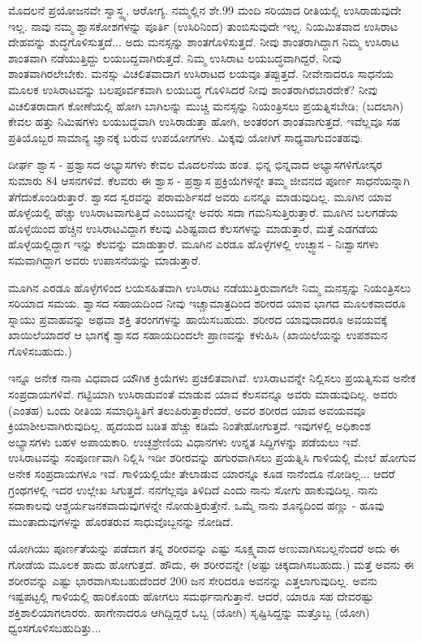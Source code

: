 ಮೊದಲನೆ ಪ್ರಯೋಜನವೇ ಸ್ವಾಸ್ಥ್ಯ, ಆರೋಗ್ಯ. ನಮ್ಮಲ್ಲಿನ ಶೇ.99 ಮಂದಿ ಸರಿಯಾದ ರೀತಿಯಲ್ಲಿ ಉಸಿರಾಡುವುದೇ ಇಲ್ಲ. ನಾವು ನಮ್ಮ ಶ್ವಾಸಕೋಶಗಳನ್ನು ಪೂರ್ತಿ (ಉಸಿರಿನಿಂದ) ತುಂಬಿಸುವುದೇ ಇಲ್ಲ. ನಿಯಮಿತವಾದ ಉಸಿರಾಟ ದೇಹವನ್ನು ಶುದ್ಧಗೊಳಿಸುತ್ತದೆ... ಅದು ಮನಸ್ಸನ್ನು ಶಾಂತಗೊಳಿಸುತ್ತದೆ. ನೀವು ಶಾಂತರಾಗಿದ್ದಾಗ ನಿಮ್ಮ ಉಸಿರಾಟ ಶಾಂತವಾಗಿ ನಡೆಯುತ್ತಿದ್ದು ಲಯಬದ್ದವಾಗಿರುತ್ತದೆ. ನಿಮ್ಮ ಉಸಿರಾಟ ಲಯಬದ್ಧವಾಗಿದ್ದರೆ, ನೀವು ಶಾಂತವಾಗಿರಲೇಬೇಕು. ಮನಸ್ಸು ವಿಚಲಿತವಾದಾಗ ಉಸಿರಾಟದ ಲಯವೂ ತಪ್ಪುತ್ತದೆ. ನೀವೇನಾದರೂ ಸಾಧನೆಯ ಮೂಲಕ ಉಸಿರಾಟವನ್ನು ಬಲಪೂರ್ವಕವಾಗಿ ಲಯಬದ್ಧ ಗೊಳಿಸಿದರೆ ನೀವು ಶಾಂತರಾಗಿರಬಾರದೇಕೆ? ನೀವು ವಿಚಲಿತರಾದಾಗ ಕೋಣೆಯಲ್ಲಿ ಹೋಗಿ ಬಾಗಿಲನ್ನು ಮುಚ್ಚಿ ಮನಸ್ಸನ್ನು ನಿಯಂತ್ರಿಸಲು ಪ್ರಯತ್ನಿಸಬೇಡಿ; (ಬದಲಾಗಿ) ಕೇವಲ ಹತ್ತು ನಿಮಿಷಗಳು ಲಯಬದ್ಧವಾಗಿ ಉಸಿರಾಡುತ್ತಾ ಹೋಗಿ, ಅಂತರಂಗ ಶಾಂತವಾಗುತ್ತದೆ. ಇವೆಲ್ಲವೂ ಸಹ ಪ್ರತಿಯೊಬ್ಬರ ಸಾಮಾನ್ಯ ಜ್ಞಾನಕ್ಕೆ ಬರುವ ಉಪಯೋಗಗಳು. ಮಿಕ್ಕವು ಯೋಗಿಗೆ ಸಾಧ್ಯವಾಗುವಂತಹವು.

ದೀರ್ಘ ಶ್ವಾಸ - ಪ್ರಶ್ವಾಸದ ಅಭ್ಯಾಸಗಳು ಕೇವಲ ಮೊದಲನೆಯ ಹಂತ. ಭಿನ್ನ ಭಿನ್ನವಾದ ಅಭ್ಯಾಸಗಳಿಗೋಸ್ಕರ ಸುಮಾರು 84 ಆಸನಗಳಿವೆ. ಕೆಲವರು ಈ ಶ್ವಾಸ - ಪ್ರಶ್ವಾಸ ಪ್ರಕ್ರಿಯೆಗಳನ್ನೇ ತಮ್ಮ ಜೀವನದ ಪೂರ್ಣ ಸಾಧನೆಯನ್ನಾಗಿ ತೆಗೆದುಕೊಂಡಿರುತ್ತಾರೆ. ಶ್ವಾಸದ ಸ್ವರವನ್ನು ಪರಾಮರ್ಶಿಸದೆ ಅವರು ಏನನ್ನೂ ಮಾಡುವುದಿಲ್ಲ. ಮೂಗಿನ ಯಾವ ಹೊಳ್ಳೆಯಲ್ಲಿ ಹೆಚ್ಚು ಉಸಿರಾಟವಾಗುತ್ತಿದೆ ಎಂಬುದನ್ನೇ ಅವರು ಸದಾ ಗಮನಿಸುತ್ತಿರುತ್ತಾರೆ. ಮೂಗಿನ ಬಲಗಡೆಯ ಹೊಳ್ಳೆಯಿಂದ ಹೆಚ್ಚಿನ ಉಸಿರಾಟವಿದ್ದಾಗ ಕೆಲವು ವಿಶಿಷ್ಟವಾದ ಕೆಲಸಗಳನ್ನು ಮಾಡುತ್ತಾರೆ, ಮತ್ತೆ ಎಡಗಡೆಯ ಹೊಳ್ಳೆಯಲ್ಲಿದ್ದಾಗ ಇನ್ನು ಕೆಲವನ್ನು ಮಾಡುತ್ತಾರೆ. ಮೂಗಿನ ಎರಡೂ ಹೊಳ್ಳೆಗಳಲ್ಲಿ ಉಚ್ಛ್ವಾಸ - ನಿಃಶ್ವಾಸಗಳು ಸಮವಾಗಿದ್ದಾಗ ಅವರು ಉಪಾಸನೆಯನ್ನು ಮಾಡುತ್ತಾರೆ.

ಮೂಗಿನ ಎರಡೂ ಹೊಳ್ಳೆಗಳಿಂದ ಲಯಸಹಿತವಾಗಿ ಉಸಿರಾಟ ನಡೆಯುತ್ತಿರುವಾಗಲೇ ನಿಮ್ಮ ಮನಸ್ಸನ್ನು ನಿಯಂತ್ರಿಸಲು ಸರಿಯಾದ ಸಮಯ. ಶ್ವಾಸದ ಸಹಾಯದಿಂದ ನೀವು ಇಚ್ಚಾಮಾತ್ರದಿಂದ ಶರೀರದ ಯಾವ ಭಾಗದ ಮೂಲಕವಾದರೂ ಸ್ನಾಯು ಪ್ರವಾಹವನ್ನು ಅಥವಾ ಶಕ್ತಿ ತರಂಗಗಳನ್ನು ಹಾಯಿಸಬಹುದು. ಶರೀರದ ಯಾವುದಾದರೂ ಅವಯವಕ್ಕೆ ಖಾಯಿಲೆಯಾದರೆ ಆ ಭಾಗಕ್ಕೆ ಶ್ವಾಸದ ಸಹಾಯದಿಂದಲೇ ಪ್ರಾಣವನ್ನು ಕಳುಹಿಸಿ (ಖಾಯಿಲೆಯನ್ನು ಉಪಶಮನ ಗೊಳಿಸಬಹುದು.)

ಇನ್ನೂ ಅನೇಕ ನಾನಾ ವಿಧವಾದ ಯೌಗಿಕ ಕ್ರಿಯೆಗಳು ಪ್ರಚಲಿತವಾಗಿವೆ. ಉಸಿರಾಟವನ್ನೇ ನಿಲ್ಲಿಸಲು ಪ್ರಯತ್ನಿಸುವ ಅನೇಕ ಸಂಪ್ರದಾಯಗಳಿವೆ. ಗಟ್ಟಿಯಾಗಿ ಉಸಿರಾಡುವಂತೆ ಮಾಡುವ ಯಾವ ಕೆಲಸವನ್ನೂ ಅವರು ಮಾಡುವುದಿಲ್ಲ. ಅವರು (ಎಂತಹ) ಒಂದು ರೀತಿಯ ಸಮಾಧಿಸ್ಥಿತಿಗೆ ತಲುಪಿರುತ್ತಾರೆಂದರೆ, ಅವರ ಶರೀರದ ಯಾವ ಅವಯವವೂ ಕ್ರಿಯಾಶೀಲವಾಗಿರುವುದಿಲ್ಲ. ಹೃದಯದ ಬಡಿತ ಹೆಚ್ಚು ಕಡಿಮೆ ನಿಂತೇಹೋಗುತ್ತದೆ. ಇವುಗಳಲ್ಲಿ ಅಧಿಕಾಂಶ ಅಭ್ಯಾಸಗಳು ಬಹಳ ಅಪಾಯಕಾರಿ. ಉಚ್ಛಶ್ರೇಣಿಯ ವಿಧಾನಗಳು ಉನ್ನತ ಸಿದ್ದಿಗಳನ್ನು ಪಡೆಯಲು ಇವೆ. ಉಸಿರಾಟವನ್ನು ಸಂಪೂರ್ಣವಾಗಿ ನಿಲ್ಲಿಸಿ ಇಡೀ ಶರೀರವನ್ನು ಹಗುರವಾಗಿಸಲು ಪ್ರಯತ್ನಿಸಿ ಗಾಳಿಯಲ್ಲಿ ಮೇಲೆ ಹೋಗುವ ಅನೇಕ ಸಂಪ್ರದಾಯಗಳೂ ಇವೆ. ಗಾಳಿಯಲ್ಲಿಯೇ ತೇಲಾಡುವ ಯಾರನ್ನೂ ಕೂಡ ನಾನೆಂದೂ ನೋಡಿಲ್ಲ... ಆದರೆ ಗ್ರಂಥಗಳಲ್ಲಿ ಇದರ ಉಲ್ಲೇಖ ಸಿಗುತ್ತದೆ. ನನಗೆಲ್ಲವೂ ತಿಳಿದಿದೆ ಎಂದು ನಾನು ಸೋಗು ಹಾಕುವುದಿಲ್ಲ. ನಾನು ಸದಾಕಾಲವು ಆಶ್ಚರ್ಯಜನಕವಾದುವುಗಳನ್ನೇ ನೋಡುತ್ತಿರುತ್ತೇನೆ. ಒಮ್ಮೆ ನಾನು ಶೂನ್ಯದಿಂದ ಹಣ್ಣು - ಹೂವು ಮುಂತಾದುವುಗಳನ್ನು ಹೊರತರುವ ಸಾಧುವೊಬ್ಬನನ್ನು ನೋಡಿದೆ.

ಯೋಗಿಯು ಪೂರ್ಣತೆಯನ್ನು ಪಡೆದಾಗ ತನ್ನ ಶರೀರವನ್ನು ಎಷ್ಟು ಸೂಕ್ಷ್ಮವಾದ ಅಣುವಾಗಿಸಬಲ್ಲನೆಂದರೆ ಅದು ಈ ಗೋಡೆಯ ಮೂಲಕ ಹಾದು ಹೋಗುತ್ತದೆ. ಹೌದು, ಈ ಶರೀರವನ್ನೇ (ಅಷ್ಟು ಚಿಕ್ಕದಾಗಿಸಬಹುದು.) ಮತ್ತೆ ಅವನು ಈ ಶರೀರವನ್ನು ಎಷ್ಟು ಭಾರವಾಗಿಸುಬಹುದೆಂದರೆ 200 ಜನ ಸೇರಿದರೂ ಅವನನ್ನು ಎತ್ತಲಾಗುವುದಿಲ್ಲ. ಅವನು ಇಷ್ಟಪಟ್ಟಲ್ಲಿ ಗಾಳಿಯಲ್ಲಿ ಹಾರಿಕೊಂಡು ಹೋಗಲು ಸಮರ್ಥನಾಗುತ್ತಾನೆ. ಆದರೆ, ಯಾರೂ ಸಹ ದೇವರಷ್ಟು ಶಕ್ತಿಶಾಲಿಯಾಗಲಾರರು. ಹಾಗೇನಾದರೂ ಆಗಿದ್ದಿದ್ದರೆ ಒಬ್ಬ (ಯೋಗಿ) ಸೃಷ್ಟಿಸಿದ್ದನ್ನು ಮತ್ತೊಬ್ಬ (ಯೋಗಿ) ಧ್ವಂಸಗೊಳಿಸಬಹುದಿತ್ತು...

